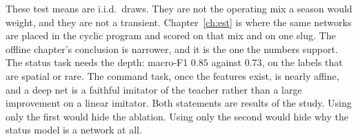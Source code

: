 These test means are i.i.d.\ draws. They are not the operating mix a season would weight, and they are not a transient. Chapter~\ref{ch:est} is where the same networks are placed in the cyclic program and scored on that mix and on one slug. The offline chapter's conclusion is narrower, and it is the one the numbers support. The status task needs the depth: macro-F1 \(0.85\) against \(0.73\), on the labels that are spatial or rare. The command task, once the features exist, is nearly affine, and a deep net is a faithful imitator of the teacher rather than a large improvement on a linear imitator. Both statements are results of the study. Using only the first would hide the ablation. Using only the second would hide why the status model is a network at all.
